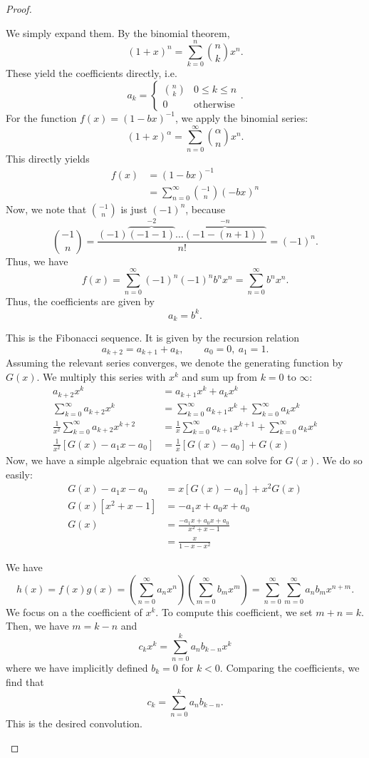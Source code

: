 \begin{proof}
	\begin{parts}
	\item We simply expand them. By the binomial theorem,
		\[
			(1+x)^n = \sum_{k=0}^{n} \binom{n}{k}x^n
		.\] 
		These yield the coefficients directly, i.e.
		\[
		a_k = \begin{cases}
			\binom{n}{k} & 0 \le k \le n\\
			0 &\text{otherwise}
		\end{cases}
		.\] 
		For the function $f(x) = (1-bx)^{-1}$, we apply the binomial series:
		\[
			(1+x)^\alpha = \sum_{n=0}^{\infty} \binom{\alpha}{n}x^n
		.\] 
		This directly yields
		\begin{align*}
			f(x) &= (1-bx)^{-1} \\
			     &= \sum_{n=0}^{\infty} \binom{-1}{n}(-bx)^n 
		\end{align*}
		Now, we note that $\binom{-1}{n}$ is just $(-1)^{n}$, because
		\[
			\binom{-1}{n} = \frac{(-1)\overbrace{(-1 - 1)}^{-2}\dots \overbrace{(-1 - (n+1))}^{-n}}{n!}=(-1)^n
		.\] 
		Thus, we have
		\[
		f(x) = \sum_{n=0}^{\infty} (-1)^n (-1)^n b^n x^n = \sum_{n=0}^{\infty} b^n x^n
		.\] 
		Thus, the coefficients are given by
		\[
		a_k = b^k
		.\] 
	\item This is the Fibonacci sequence. It is given by the recursion relation
		\[
			a_{k+2} = a_{k+1} + a_{k},\qquad a_0 = 0,~a_1 = 1
		.\] 
		Assuming the relevant series converges, we denote the generating function by $G(x)$. We multiply this series with $x^k$ and sum up from $k=0$ to $\infty$:
\begin{align*}
	a_{k+2}x^k &= a_{k+1}x^k + a_k x^k \\
	\sum_{k=0}^{\infty} a_{k+2}x^k &= \sum_{k=0}^{\infty} a_{k+1}x^k + \sum_{k=0}^{\infty} a_k x^k \\
	\frac{1}{x^2}\sum_{k=0}^{\infty} a_{k+2}x^{k+2} &= \frac{1}{x}\sum_{k=0}^{\infty} a_{k+1}x^{k+1} + \sum_{k=0}^{\infty} a_k x^k \\
	\frac{1}{x^2}\left[ G(x) - a_1x - a_0 \right] &= \frac{1}{x}\left[ G(x) - a_0 \right] +G(x) 
\end{align*}
Now, we have a simple algebraic equation that we can solve for $G(x)$. We do so easily:
\begin{align*}
	G(x) - a_1 x - a_0 &= x[G(x) - a_0] + x^2 G(x) \\
	G(x)[x^2 + x - 1] &= - a_1x + a_0x + a_0 \\
	G(x) &= \frac{-a_1 x + a_0 x + a_0}{x^2+x-1}\\
	&= \frac{x}{1-x-x^2} 
\end{align*}
\item We have
	\[
		h(x) = f(x)g(x) = \left( \sum_{n=0}^{\infty} a_n x^n \right) \left( \sum_{m=0}^{\infty} b_m x^m \right) = \sum_{n=0}^{\infty} \sum_{m=0}^{\infty} a_n b_m x^{n+m}
	.\] 
	We focus on a the coefficient of $x^k$. To compute this coefficient, we set $m+n=k$. Then, we have $m=k-n$ and
	\[
		c_k x^k = \sum_{n=0}^{k} a_n b_{k-n}x^k
	\] 
	where we have implicitly defined $b_{k}=0$ for $k<0$. Comparing the coefficients, we find that
	\[
		c_k = \sum_{n=0}^k a_n b_{k-n}
	.\] 
	This is the desired convolution.\qedhere
	\end{parts}
\end{proof}

